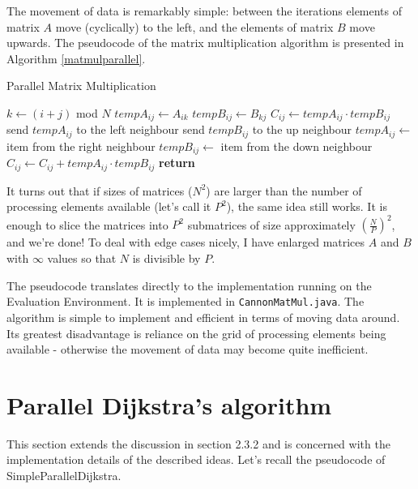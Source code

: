 \documentclass[12pt,a4paper,oneside,openright]{report}
\begin{document}
The movement of data is remarkably simple: between the iterations elements of matrix $A$ move (cyclically) to the left, and the elements of matrix $B$ move upwards. The pseudocode of the matrix multiplication algorithm is presented in Algorithm \ref{matmulparallel}.

\begin{algorithm}
\caption{Parallel Matrix Multiplication}\label{matmulparallel}
\begin{algorithmic}[1]
\State $k \gets (i+j)$ mod $N$
\State $tempA_{ij} \gets A_{ik}$
\State $tempB_{ij} \gets B_{kj}$
\State $C_{ij} \gets tempA_{ij} \cdot tempB_{ij}$
\State send $tempA_{ij}$ to the left neighbour
\State send $tempB_{ij}$ to the up neighbour
\State {}
\State $tempA_{ij} \gets$ item from the right neighbour
\State $tempB_{ij} \gets$ item from the down neighbour
\State $C_{ij} \gets C_{ij} + tempA_{ij} \cdot tempB_{ij}$
\EndFor
\EndFor
\State \textbf{return} 
\EndProcedure
\end{algorithmic}
\end{algorithm}

It turns out that if sizes of matrices ($N^2$) are larger than the number of processing elements available (let's call it $P^2$), the same idea still works. It is enough to slice the matrices into $P^2$ submatrices of size approximately $(\frac{N}{P})^2$, and we're done! To deal with edge cases nicely, I have enlarged matrices $A$ and $B$ with $\infty$ values so that $N$ is divisible by $P$.

The pseudocode translates directly to the implementation running on the Evaluation Environment. It is implemented in \texttt{CannonMatMul.java}. The algorithm is simple to implement and efficient in terms of moving data around. Its greatest disadvantage is reliance on the grid of processing elements being available - otherwise the movement of data may become quite inefficient.

\section{Parallel Dijkstra's algorithm}
This section extends the discussion in section 2.3.2 and is concerned with the implementation details of the described ideas. Let's recall the pseudocode of SimpleParallelDijkstra.
\end{document}
